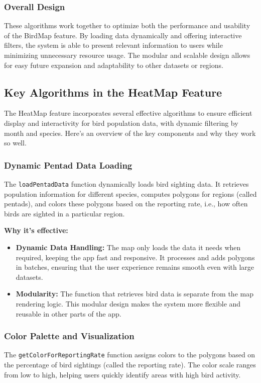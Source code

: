 \documentclass{article}
\begin{document}
\subsubsection{Overall Design}
These algorithms work together to optimize both the performance and usability of the BirdMap feature. By loading data dynamically and offering interactive filters, the system is able to present relevant information to users while minimizing unnecessary resource usage. The modular and scalable design allows for easy future expansion and adaptability to other datasets or regions.

\subsection{Key Algorithms in the HeatMap Feature}

The HeatMap feature incorporates several effective algorithms to ensure efficient display and interactivity for bird population data, with dynamic filtering by month and species. Here's an overview of the key components and why they work so well.

\subsubsection{Dynamic Pentad Data Loading}
The \texttt{loadPentadData} function dynamically loads bird sighting data. It retrieves population information for different species, computes polygons for regions (called pentads), and colors these polygons based on the reporting rate, i.e., how often birds are sighted in a particular region.

\textbf{Why it's effective:}
\begin{itemize}
    \item \textbf{Dynamic Data Handling:} The map only loads the data it needs when required, keeping the app fast and responsive. It processes and adds polygons in batches, ensuring that the user experience remains smooth even with large datasets.
    \item \textbf{Modularity:} The function that retrieves bird data is separate from the map rendering logic. This modular design makes the system more flexible and reusable in other parts of the app.
\end{itemize}

\subsubsection{Color Palette and Visualization}
The \texttt{getColorForReportingRate} function assigns colors to the polygons based on the percentage of bird sightings (called the reporting rate). The color scale ranges from low to high, helping users quickly identify areas with high bird activity.
\end{document}
